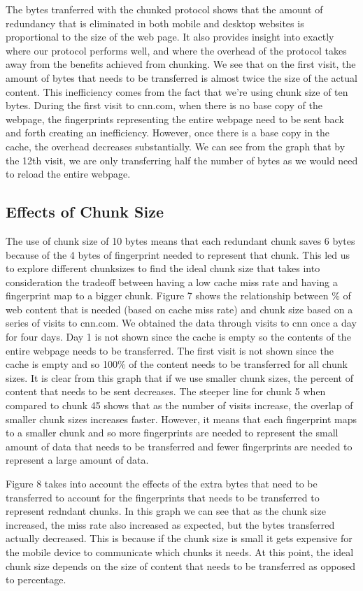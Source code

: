 The bytes tranferred with the chunked protocol shows that the amount of redundancy that is eliminated in both mobile and desktop websites is proportional to the size of the web page. 
It also provides insight into exactly where our protocol performs well, and where the overhead of the protocol takes away from the benefits achieved from chunking. 
We see that on the first visit, the amount of bytes that needs to be transferred is almost twice the size of the actual content. 
This inefficiency comes from the fact that we're using chunk size of ten bytes. 
During the first visit to cnn.com, when there is no base copy of the webpage, the fingerprints representing the entire webpage need to be sent back and forth creating an inefficiency. 
However, once there is a base copy in the cache, the overhead decreases substantially. 
We can see from the graph that by the 12th visit, we are only transferring half the number of bytes as we would need to reload the entire webpage. 

\subsection{Effects of Chunk Size}
The use of chunk size of 10 bytes means that each redundant chunk saves 6 bytes because of the 4 bytes of fingerprint needed to represent that chunk. 
This led us to explore different chunksizes to find the ideal chunk size that takes into consideration the tradeoff between having a low cache miss rate and having a fingerprint map to a bigger chunk.  Figure 7 shows the relationship between \% of web content that is needed (based on cache miss rate) and chunk size based on a series of visits to cnn.com. We obtained the data through visits to cnn once a day for four days. Day 1 is not shown since the cache is empty so the contents of the entire webpage needs to be transferred. 
The first visit is not shown since the cache is empty and so 100\% of the content needs to be transferred for all chunk sizes. 
It is clear from this graph that if we use smaller chunk sizes, the percent of content that needs to be sent decreases. 
The steeper line for chunk 5 when compared to chunk 45 shows that as the number of visits increase, the overlap of smaller chunk sizes increases faster.
However, it means that each fingerprint maps to a smaller chunk and so more fingerprints are needed to represent the small amount of data that needs to be transferred and fewer fingerprints are needed to represent a large amount of data. 

Figure 8 takes into account the effects of the extra bytes that need to be transferred to account for the fingerprints that needs to be transferred to represent redndant chunks. In this graph we can see that as the chunk size increased, the miss rate also increased as expected, but the bytes transferred actually decreased. 
This is because if the chunk size is small it gets expensive for the mobile device to communicate which chunks it needs. 
At this point, the ideal chunk size depends on the size of content that needs to be transferred as opposed to percentage.

